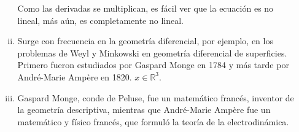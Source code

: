 \documentclass[fleqn]{article}
\newcommand{\real}{\mathbb{R}}
\begin{document}
\begin{enumerate}[(a)]
\begin{enumerate}[(i)]
			Como las derivadas se multiplican, es fácil ver que la ecuación es no lineal, más aún, es completamente no lineal.
			
			\item Surge con frecuencia en la geometría diferencial, por ejemplo, en los problemas de Weyl y Minkowski en geometría diferencial de superficies. Primero fueron estudiados por Gaspard Monge en 1784 y más tarde por André-Marie Ampère en 1820. $ x \in \real^3 $.
			
			\item Gaspard Monge, conde de Peluse, fue un matemático francés, inventor de la geometría descriptiva, mientras que André-Marie Ampère fue un matemático y físico francés, que formuló la teoría de la electrodinámica.
		\end{enumerate}

	\end{enumerate}
\end{document}
